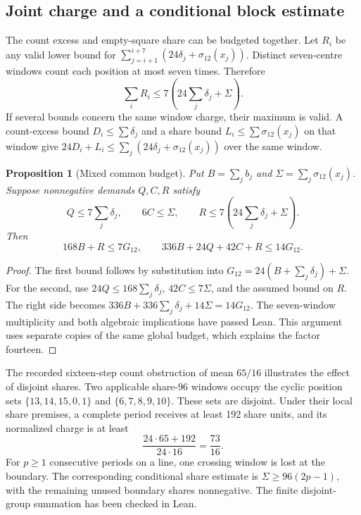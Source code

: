 \documentclass[11pt,a4paper]{article}
\newtheorem{proposition}[theorem]{Proposition}
\theoremstyle{definition}
\theoremstyle{remark}
\begin{document}
\subsection{Joint charge and a conditional block estimate}
The count excess and empty-square share can be budgeted together. Let $R_i$ be any valid lower bound for $\sum_{j=i+1}^{i+7}(24\delta_j+\sigma_{12}(x_j))$. Distinct seven-centre windows count each position at most seven times. Therefore
\[
\sum_i R_i\le7\left(24\sum_j\delta_j+\Sigma\right).
\]
If several bounds concern the same window charge, their maximum is valid. A count-excess bound $D_i\le\sum\delta_j$ and a share bound $L_i\le\sum\sigma_{12}(x_j)$ on that window give $24D_i+L_i\le\sum_j(24\delta_j+\sigma_{12}(x_j))$ over the same window.

\begin{proposition}[Mixed common budget]\label{prop:mixed-common-budget}
Put $B=\sum_jb_j$ and $\Sigma=\sum_j\sigma_{12}(x_j)$. Suppose nonnegative
demands $Q,C,R$ satisfy
\[
Q\le7\sum_j\delta_j,\qquad6C\le\Sigma,\qquad
R\le7\left(24\sum_j\delta_j+\Sigma\right).
\]
Then
\[
168B+R\le7G_{12},\qquad
336B+24Q+42C+R\le14G_{12}.
\]
\end{proposition}
\begin{proof}
The first bound follows by substitution into $G_{12}=24(B+\sum_j\delta_j)+\Sigma$. For the second, use $24Q\le168\sum_j\delta_j$, $42C\le7\Sigma$, and the assumed bound on $R$. The right side becomes $336B+336\sum_j\delta_j+14\Sigma=14G_{12}$. The seven-window multiplicity and both algebraic implications have passed Lean. This argument uses separate copies of the same global budget, which explains the factor fourteen.
\end{proof}

The recorded sixteen-step count obstruction of mean $65/16$ illustrates the effect of disjoint shares. Two applicable share-96 windows occupy the cyclic position sets $\{13,14,15,0,1\}$ and $\{6,7,8,9,10\}$. These sets are disjoint. Under their local share premises, a complete period receives at least 192 share units, and its normalized charge is at least
\[
\frac{24\cdot65+192}{24\cdot16}=\frac{73}{16}.
\]
For $p\ge1$ consecutive periods on a line, one crossing window is lost at the boundary. The corresponding conditional share estimate is $\Sigma\ge96(2p-1)$, with the remaining unused boundary shares nonnegative. The finite disjoint-group summation has been checked in Lean.
\end{document}
